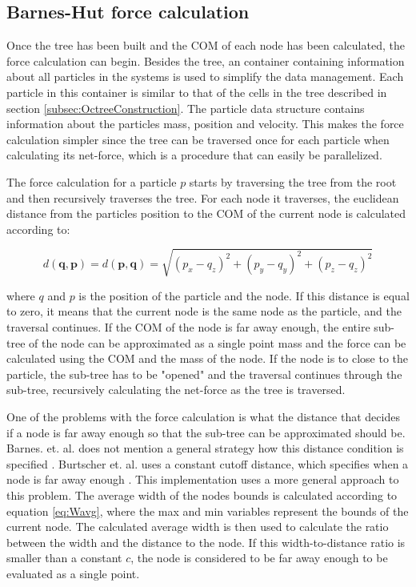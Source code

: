 \subsection{Barnes-Hut force calculation}
Once the tree has been built and the COM of each node has been calculated, the force calculation can begin. Besides the tree, an container containing information about all particles in the systems is used to simplify the data management. Each particle in this container is similar to that of the cells in the tree described in section \ref{subsec:OctreeConstruction}. The particle data structure contains information about the particles mass, position and velocity. This makes the force calculation simpler since the tree can be traversed once for each particle when calculating its net-force, which is a procedure that can easily be parallelized. 

The force calculation for a particle $p$ starts by traversing the tree from the root and then recursively traverses the tree. For each node it traverses, the euclidean distance from the particles position to the COM of the current node is calculated according to: 

\begin{equation} \label{eq:EucDist}
    d(\boldsymbol q, \boldsymbol p) = d(\boldsymbol p, \boldsymbol q) = \sqrt{(p_x-q_z)^2 +(p_y - q_y)^2 + (p_z - q_z)^2}
\end{equation}

\noindent where $q$ and $p$ is the position of the particle and the node. If this distance is equal to zero, it means that the current node is the same node as the particle, and the traversal continues. If the COM of the node is far away enough, the entire sub-tree of the node can be approximated as a single point mass and the force can be calculated using the COM and the mass of the node. If the node is to close to the particle, the sub-tree has to be "opened" and the traversal continues through the sub-tree, recursively calculating the net-force as the tree is traversed. 

One of the problems with the force calculation is what the distance that decides if a node is far away enough so that the sub-tree can be approximated should be. Barnes. et. al. does not mention a general strategy how this distance condition is specified  \cite{barnes1986hierarchical} . Burtscher et. al. uses a constant cutoff distance, which specifies when a node is far away enough \cite{burtscher2011efficient}.
This implementation uses a more general approach to this problem. The average width of the nodes bounds is calculated according to equation \ref{eq:Wavg}, where the max and min variables represent the bounds of the current node. The calculated average width is then used to calculate the ratio between the width and the distance to the node. If this width-to-distance ratio is smaller than a constant $c$, the node is considered to be far away enough to be evaluated as a single point. 

